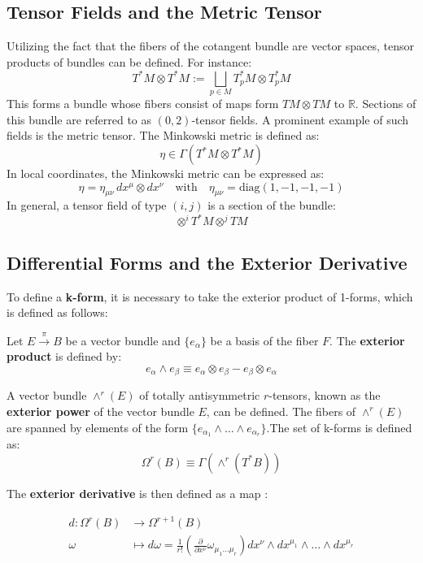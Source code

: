 \subsection{Tensor Fields and the Metric Tensor}

Utilizing the fact that the fibers of the cotangent bundle are vector spaces, tensor products of bundles can be defined. For instance:
\[
T^*M \otimes T^*M := \bigsqcup_{p \in M} T_p^*M \otimes T_p^*M
\]
This forms a bundle whose fibers consist of maps form $TM \otimes TM$ to $\mathbb{R}$. Sections of this bundle are referred to as \((0,2)\)-tensor fields. A prominent example of such fields is the metric tensor. The Minkowski metric is defined as:
\[
\eta \in \Gamma(T^*M \otimes T^*M)
\]
In local coordinates, the Minkowski metric can be expressed as:
\[
\eta = \eta_{\mu\nu} \, dx^\mu \otimes dx^\nu
\quad \text{with} \quad \eta_{\mu\nu} = \text{diag}(1, -1, -1, -1)
\]
In general, a tensor field of type $(i,j)$ is a section of the bundle\cite{NakaharaGeometrytopologyphysics2005}:
\[ \otimes^iT^*M \otimes^jTM \]


\subsection{Differential Forms and the Exterior Derivative}
To define a \textbf{k-form}, it is necessary to take the exterior product of 1-forms, which is defined as follows:

Let \(E \xrightarrow{\pi} B\) be a vector bundle and \(\{e_\alpha\}\) be a basis of the fiber \(F\). The \textbf{exterior product} is defined by:
\[e_\alpha \wedge e_\beta \equiv e_\alpha \otimes e_\beta - e_\beta \otimes e_\alpha\]

A vector bundle \(\wedge^r (E)\) of totally antisymmetric \(r\)-tensors, known as the \textbf{exterior power} of the vector bundle \(E\), can be defined. The fibers of \(\wedge^r (E)\) are spanned by elements of the form \(\{ e_{\alpha_1} \wedge \dots \wedge e_{\alpha_r} \}\).The set of k-forms is defined as:
\[\Omega^r(B) \equiv \Gamma(\wedge^r (T^*B))\]

The \textbf{exterior derivative} is then defined as a map \cite{NakaharaGeometrytopologyphysics2005}:

\begin{align*}
  d: \Omega^r(B) &\to \Omega^{r+1}(B) \\
  \omega &\mapsto d\omega = \frac{1}{r!}\left( \frac{\partial}{ \partial x^\nu} \omega_{\mu_1 \dots \mu_r} \right) dx^\nu \wedge dx^{\mu_1} \wedge \dots \wedge dx^{\mu_r}
\end{align*}
